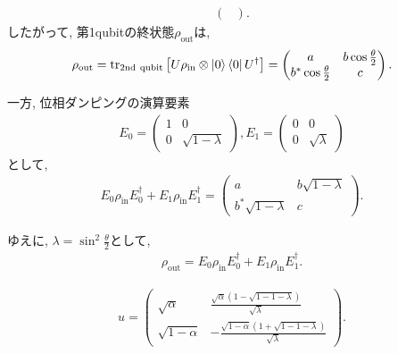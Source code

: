 \begin{ex}
\begin{align*}
\begin{pmatrix}
        \end{pmatrix}.
    \end{align*}
    したがって, 第1qubitの終状態$\rho_\mathrm{out}$は,
    \begin{align*}
        \rho_\mathrm{out}
        =
        \mathrm{tr}_\mathrm{2nd\ qubit} \left[U  \rho_\mathrm{in} \otimes \ket{0}\bra{0} U^\dagger\right]
        =
        \begin{pmatrix}
            a                         & b \cos\frac{\theta}{2} \\
            b^* \cos \frac{\theta}{2} & c
        \end{pmatrix}.
    \end{align*}
    \par
    一方, 
    位相ダンピングの演算要素
    \begin{align*}
        E_0 =
        \begin{pmatrix}
            1 & 0                \\
            0 & \sqrt{1- \lambda}
        \end{pmatrix}
        ,
        E_1 =
        \begin{pmatrix}
            0 & 0 \\
            0 & \sqrt{\lambda}
        \end{pmatrix}
    \end{align*}
    として,
    \begin{align*}
        E_0 \rho_\mathrm{in} E_0^\dagger + E_1 \rho_\mathrm{in} E_1^\dagger = 
        \begin{pmatrix}
            a & b \sqrt{1 - \lambda} \\
            b^* \sqrt{1 - \lambda} & c
        \end{pmatrix}.
    \end{align*}
    \par
    ゆえに, $\lambda = \sin^2 \frac{\theta}{2}$として,
    \begin{align*}
        \rho_\mathrm{out} = E_0 \rho_\mathrm{in} E_0^\dagger + E_1 \rho_\mathrm{in} E_1^\dagger.
    \end{align*}
\end{ex}


\begin{ex}
    \label{ex8.27}
    \begin{align*}
        u =
        \begin{pmatrix}
            \sqrt{\alpha}     & \frac{\sqrt{\alpha} \left( 1 - \sqrt{1 - 1- \lambda}\right)}{\sqrt{\lambda}}       \\
            \sqrt{1 - \alpha} & - \frac{\sqrt{1 - \alpha} \left( 1 + \sqrt{1 - 1- \lambda}\right)}{\sqrt{\lambda}}
        \end{pmatrix}.
    \end{align*}
\end{ex}

